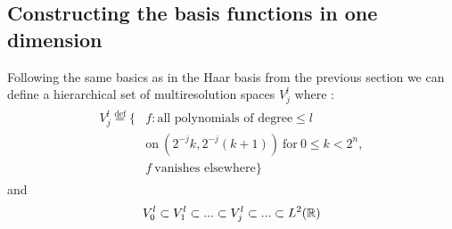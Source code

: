 \documentclass[../master_thesis.tex]{subfiles}
\begin{document}
\subsection{Constructing the basis functions in one dimension}
Following the same basics as in the Haar basis from the previous section we can
define a hierarchical set of multiresolution spaces $V_j^l$ where \cite{Frediani:2013}:
\begin{align}
  \begin{split}
    V_j^l \stackrel{\text{def}}{=} \{&f: \text{all polynomials of degree} \leqslant
    l\  \\
    &\text{on}\  (2^{-j}k,2^{-j}(k+1))\ \text{for}\ 0\leqslant k < 2^{n},\\
    &f\  \text{vanishes elsewhere}\}
  \end{split}
\end{align}
and
\begin{equation}
  V_0^l \subset V_1^l \subset ... \subset V^l_j \subset ... \subset L^2(\mathbb{R})
\end{equation}
\end{document}
